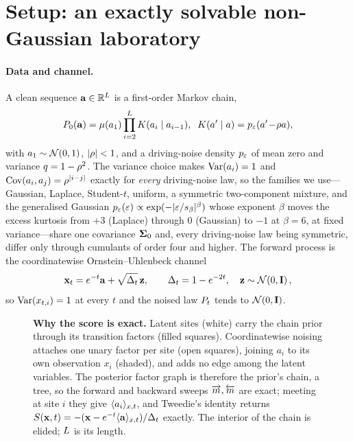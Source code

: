 \section{Setup: an exactly solvable non-Gaussian laboratory}
\label{sec:setup}

\paragraph{Data and channel.}
A clean sequence $\mathbf{a}\in\mathbb{R}^{L}$ is a first-order Markov chain,
\begin{equation}
  P_0(\mathbf{a})=\mu(a_1)\prod_{i=2}^{L}K(a_i\mid a_{i-1}),\;\;
  K(a'\mid a)=p_{\varepsilon}(a'\!-\!\rho a),
  \label{eq:prior}
\end{equation}
with $a_1\sim\mathcal{N}\!\left(0,1\right)$, $|\rho|<1$, and a driving-noise density $p_{\varepsilon}$ of mean zero
and variance $q=1-\rho^2$. The variance choice makes $\operatorname{Var}(a_i)=1$ and
$\operatorname{Cov}(a_i,a_j)=\rho^{|i-j|}$ exactly for \emph{every} driving-noise law, so the families we
use---Gaussian, Laplace, Student-$t$, uniform, a symmetric two-component mixture, and the
generalised Gaussian $p_{\varepsilon}(\varepsilon)\propto\exp(-|\varepsilon/s_\beta|^\beta)$
whose exponent $\beta$ moves the excess kurtosis from $+3$ (Laplace) through $0$
(Gaussian) to $-1$ at $\beta=6$, at fixed variance---share one covariance $\mathbf{\Sigma}_0$ and,
every driving-noise law being symmetric, differ only through cumulants of order four and
higher.
The forward process is the coordinatewise Ornstein--Uhlenbeck channel
\begin{equation}
  \mathbf{x}_t = e^{-t}\mathbf{a} + \sqrt{\Delta_t}\,\mathbf{z},\qquad \Delta_t=1-e^{-2t},\quad \mathbf{z}\sim\mathcal{N}\!\left(0,\mathbf{I}\right),
  \label{eq:channel}
\end{equation}
so $\operatorname{Var}(x_{t,i})=1$ at every $t$ and the noised law $P_t$ tends to $\mathcal{N}\!\left(0,\mathbf{I}\right)$.

\begin{figure}[t]
  \centering
  
  \caption{\textbf{Why the score is exact.} Latent sites (white) carry the chain prior
  through its transition factors (filled squares). Coordinatewise noising attaches one
  unary factor per site (open squares), joining $a_i$ to its own observation $x_i$
  (shaded), and adds no edge among the latent variables. The posterior factor graph is
  therefore the prior's chain, a tree, so the forward and backward sweeps
  $\overrightarrow{m},\overleftarrow{m}$ are exact; meeting at site $i$ they give $\langle a_{i} \rangle_{x,t}$, and Tweedie's
  identity returns $S(\mathbf{x},t)=-(\mathbf{x}-e^{-t}\langle \mathbf{a} \rangle_{x,t})/\Delta_t$ exactly. The interior of
  the chain is elided; $L$ is its length.}
  \label{fig:mechanism}
\end{figure}

